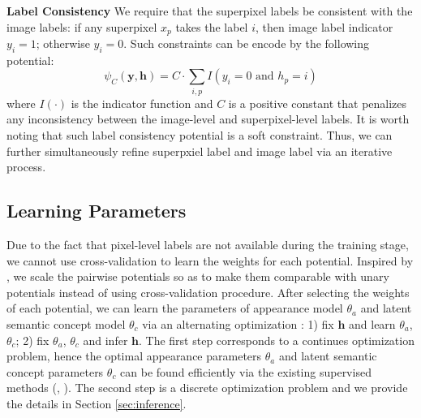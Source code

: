 \textbf{Label Consistency}
We require that the superpixel labels be consistent with the image labels: if any superpixel $x_p$ takes the label $i$, then image label indicator $y_i=1$; otherwise $y_i=0$. Such constraints can be encode by the following potential:
\begin{equation}
    \psi_{C}(\boldsymbol{y},\boldsymbol{h}) =
    C \cdot \sum_{i,p} I(y_i=0 \mbox{ and } h_p=i)
\end{equation}
where $I(\cdot)$ is the indicator function and $C$ is a positive constant that penalizes any inconsistency between the image-level and superpixel-level labels. It is worth noting that such label consistency potential is a soft constraint. Thus, we can further simultaneously refine superpxiel label and image label via an iterative process.

\subsection{Learning Parameters}
Due to the fact that pixel-level labels are not available during the training stage, we cannot use cross-validation \cite{kohli2009robust} to learn the weights for each potential.
Inspired by \cite{vezhnevets2011weakly}, we scale the pairwise potentials so as to make them comparable with unary potentials instead of using cross-validation procedure.
After selecting the weights of each potential, we can learn the parameters of appearance model $\theta_a$ and latent semantic concept model $\theta_c$ via an alternating optimization \cite{vezhnevets2011weakly}: 1) fix $\boldsymbol{h}$ and learn $\theta_a$, $\theta_c$; 2) fix $\theta_a$, $\theta_c$ and infer $\boldsymbol{h}$.
The first step corresponds to a continues optimization problem, hence the optimal appearance parameters $\theta_a$ and latent semantic concept parameters $\theta_c$ can be found efficiently via the existing supervised methods (\eg, \cite{shotton2006textonboost}). The second step is a discrete optimization problem and we provide the details in Section \ref{sec:inference}.


